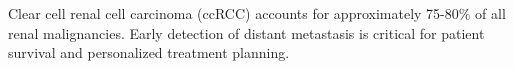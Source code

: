 Clear cell renal cell carcinoma (ccRCC) accounts for approximately 75-80\% of all renal malignancies. Early detection of distant metastasis is critical for patient survival and personalized treatment planning.
